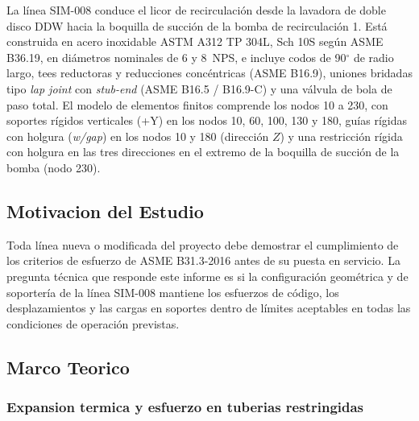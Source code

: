 La l\'{i}nea SIM-008 conduce el licor de recirculaci\'{o}n desde la lavadora de
doble disco DDW hacia la boquilla de succi\'{o}n de la bomba de recirculaci\'{o}n
1. Est\'{a} construida en acero inoxidable ASTM A312 TP 304L, Sch 10S seg\'{u}n
ASME B36.19, en di\'{a}metros nominales de 6 y 8~NPS, e incluye codos de
90$^\circ$ de radio largo, tees reductoras y reducciones conc\'{e}ntricas
(ASME B16.9), uniones bridadas tipo \textit{lap joint} con \textit{stub-end}
(ASME B16.5 / B16.9-C) y una v\'{a}lvula de bola de paso total. El modelo de
elementos finitos comprende los nodos 10 a 230, con soportes r\'{i}gidos
verticales (+Y) en los nodos 10, 60, 100, 130 y 180, gu\'{i}as r\'{i}gidas con
holgura (\textit{w/gap}) en los nodos 10 y 180 (direcci\'{o}n $Z$) y una
restricci\'{o}n r\'{i}gida con holgura en las tres direcciones en el extremo de
la boquilla de succi\'{o}n de la bomba (nodo 230).

\subsection{Motivacion del Estudio}

Toda l\'{i}nea nueva o modificada del proyecto debe demostrar el cumplimiento de
los criterios de esfuerzo de ASME B31.3-2016 antes de su puesta en servicio.
La pregunta t\'{e}cnica que responde este informe es si la configuraci\'{o}n
geom\'{e}trica y de soporter\'{i}a de la l\'{i}nea SIM-008 mantiene los esfuerzos
de c\'{o}digo, los desplazamientos y las cargas en soportes dentro de l\'{i}mites
aceptables en todas las condiciones de operaci\'{o}n previstas.

\subsection{Marco Teorico}
\label{ssec:marco}

\subsubsection{Expansion termica y esfuerzo en tuberias restringidas}

